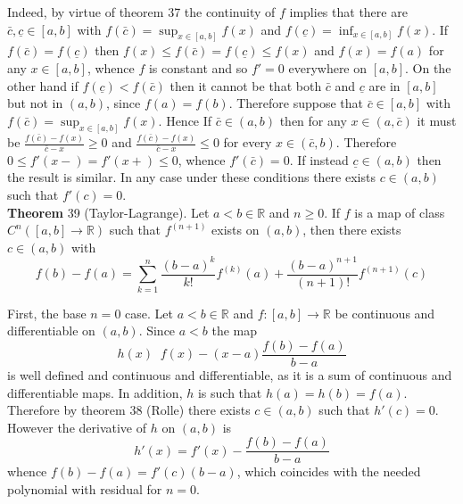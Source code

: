 \documentclass[a4paper]{article}
\newcommand{\clo}[1]{\left [ #1 \right ]}
\newcommand{\brac}[1]{\left ( #1 \right )}
\newcommand{\Real}{\mathbb{R}}
\newcommand{\defn}{\mathop{\overset{\Delta}{=}}\nolimits}
\begin{document}
Indeed, by virtue of theorem 37 the continuity of $f$ implies that there are $\bar{c}, \underline{c} \in \clo{a,b}$ with $f\brac{\bar{c}} = \sup_{x\in \clo{a,b}} f\brac{x}$ and $f\brac{\underline{c}} = \inf_{x\in \clo{a,b}} f\brac{x}$. If $f\brac{\bar{c}}=f\brac{\underline{c}}$ then $f\brac{x}\leq f\brac{\bar{c}} = f\brac{\underline{c}}\leq f\brac{x}$ and $f\brac{x} = f\brac{a}$ for any $x\in \clo{a,b}$, whence $f$ is constant and so $f' = 0$ everywhere on $\clo{a,b}$. On the other hand if $f\brac{\underline{c}} < f\brac{\bar{c}}$ then it cannot be that both $\bar{c}$ and $\underline{c}$ are in $\clo{a,b}$ but not in $\brac{a,b}$, since $f\brac{a} = f\brac{b}$. Therefore suppose that $\bar{c} \in \clo{a,b}$ with $f\brac{\bar{c}} = \sup_{x\in \clo{a,b}} f\brac{x}$. Hence If $\bar{c}\in \brac{a,b}$ then for any $x\in \brac{a,\bar{c}}$ it must be $\frac{f\brac{\bar{c}} - f\brac{x} }{\bar{c}-x} \geq 0$ and $\frac{f\brac{\bar{c}} - f\brac{x} }{\bar{c}-x} \leq 0$ for every $x\in \brac{\bar{c},b}$. Therefore $0\leq f'\brac{x-} = f'\brac{x+}\leq 0$, whence $f'\brac{\bar{c}}=0$. If instead $\underline{c}\in \brac{a,b}$ then the result is similar. In any case under these conditions there exists $c\in \brac{a,b}$ such that $f'\brac{c}=0$.\\


\label{thm:taylor_lagrange} \noindent \textbf{Theorem} 39 (Taylor-Lagrange).
Let $a<b\in \Real$ and $n\geq 0$. If $f$ is a map of class $C^n\brac{\clo{a,b}\to\Real}$ such that $f^{\brac{n+1}}$ exists on $\brac{a,b}$, then there exists $c\in \brac{a,b}$ with \[f\brac{b}-f\brac{a} = \sum_{k=1}^n \frac{\brac{b-a}^k}{k!} f^{\brac{k}}\brac{a} + \frac{\brac{b-a}^{n+1}}{\brac{n+1}!} f^{\brac{n+1}}\brac{c}\]

First, the base $n=0$ case. Let $a<b\in \Real$ and $f:\clo{a,b}\to\Real$ be continuous and differentiable on $\brac{a,b}$. Since $a<b$ the map \[h\brac{x}\defn f\brac{x} - \brac{x-a}\frac{f\brac{b}-f\brac{a}}{b-a}\] is well defined and continuous and differentiable, as it is a sum of continuous and differentiable maps. In addition, $h$ is such that $h\brac{a}=h\brac{b} = f\brac{a}$. Therefore by theorem 38 (Rolle) there exists $c\in \brac{a,b}$ such that $h'\brac{c}=0$. However the derivative of $h$ on $\brac{a,b}$ is \[h'\brac{x} = f'\brac{x} - \frac{f\brac{b}-f\brac{a}}{b-a} \] whence $f\brac{b}-f\brac{a} = f'\brac{c} \brac{b-a}$, which coincides with the needed polynomial with residual for $n=0$.
\end{document}
